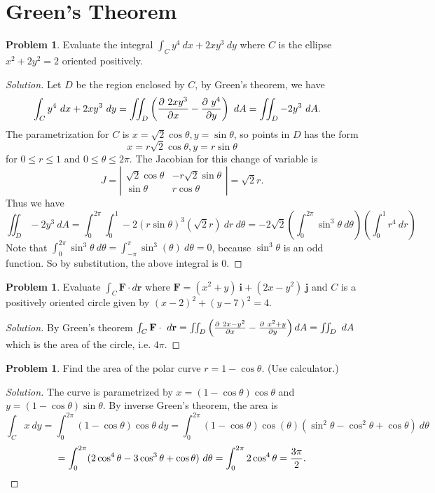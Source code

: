\documentclass[12pt]{amsart}%
\theoremstyle{plain}
\theoremstyle{definition}
\newtheorem{prob}[theorem]{Problem}
\theoremstyle{special}
\newcommand{\sol}[1]{
{\begin{proof}[Solution]#1\end{proof}}
}
\newcommand{\Prob}[1]{\begin{tcolorbox}%
\begin{prob}
	#1
\end{prob}
\end{tcolorbox}	
}
\renewcommand{\vec}{\mathbf}
\begin{document}
\section{ Green's Theorem}
\Prob{ Evaluate the integral $ \displaystyle \int_C y^4\ dx+2xy^3\ dy$ where $C$ is the ellipse $x^2+2y^2=2$ oriented positively.}
{
\sol{Let $D$ be the region enclosed by $C$, by Green's theorem, we have
\begin{align*}
\int_C 	y^4\ dx+2xy^3\ dy &=\iint_D\left({\partial\  2xy^3\over \partial x}-{\partial \ y^4\over \partial y} \right)\ dA=\iint_D -2y^3\ dA.
\end{align*}
The parametrization for $C$ is $x= \sqrt{2}\cos\theta,y=\sin\theta$, so points in $D$ has the form $$x=r\sqrt{2}\cos\theta,y=r\sin\theta$$ for $0\leq r\leq 1$ and $0\leq \theta\leq 2\pi$. The Jacobian for this change of variable is
\[J=\left|\begin{matrix}
	\sqrt{2}\cos\theta&-r\sqrt{2}\sin\theta\\\sin\theta&r\cos\theta
\end{matrix}\right|=\sqrt{2}r.\]
Thus we have
\[\iint_D-2y^3\ dA=\int_0^{2\pi} \int_0^1-2(r\sin\theta)^3(\sqrt{2}r)\ dr\ d\theta=-2\sqrt{2}\left(\int_0^{2\pi}\sin^3\theta\ d\theta\right)\left(\int_0^1r^4 \ dr\right)\]
Note that $\displaystyle\int_0^{2\pi}\sin^3 \theta\ d\theta=\int_{-\pi}^\pi\sin^3(\theta)\ d\theta=0$, because $\sin^3\theta$ is an odd function. So by substitution, the above integral is $0$.
}
}
\Prob{Evaluate $\int_C\vec F\cdot d\vec r$ where $\vec F=(x^2+y)\ \vec i+(2x-y^2)\ \vec j$ and 
$C$ is a positively oriented circle given by $(x-2)^2+(y-7)^2=4$.
}
{
\sol{
By Green's theorem
\(\int_C \vec F\cdot\ d\vec r=\iint_D\left({\partial\ 2x-y^2\over \partial x}-{\partial\ x^2+y\over\partial y}\right)dA=\iint_D\ dA\)
which is the area of the circle, i.e. $4\pi$.
}
\Prob{Find the area of the polar curve $ r=1-\cos\theta$. (Use calculator.)}
\sol{The curve is parametrized by $x=(1-\cos \theta)\cos \theta$ and $y=(1-\cos\theta)\sin\theta$. By inverse Green's theorem, the area is
\[\int_Cx\ dy=\int_0^{2\pi}(1-\cos\theta)\cos\theta \ dy=\int_0^{2\pi}(1-\cos\theta)\cos(\theta)(\sin^2\theta-\cos^2\theta+\cos\theta)\ d\theta\]
\[=\int_0^{2\pi}(2\cos^4\theta-3\cos^3\theta+\cos\theta)\ d\theta=\int_0^{2\pi}2\cos^4\theta={3\pi\over 2}.\qedhere\]
}
}
\end{document}

